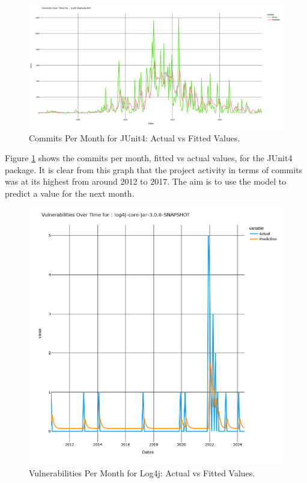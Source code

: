 \documentclass[conference]{IEEEtran}
\begin{document}
\begin{figure}
    \centering
    \includegraphics[width=1\linewidth]{JUnit4commits.png}
    \caption{Commits Per Month for JUnit4: Actual vs Fitted Values.} 
    \label{fig:commits}
\end{figure}

Figure \ref{fig:commits} shows the commits per month, fitted vs actual values, for the JUnit4 package. It is clear from this graph that the project activity in terms of commits was at its highest from around 2012 to 2017. The aim is to use the model to predict a value for the next month. 

\begin{figure}
    \centering
    \includegraphics[width=1\linewidth]{Log4jVuls.png}
    \caption{Vulnerabilities Per Month for Log4j: Actual vs Fitted Values.} 
    \label{fig:vulns}
\end{figure}
\end{document}

